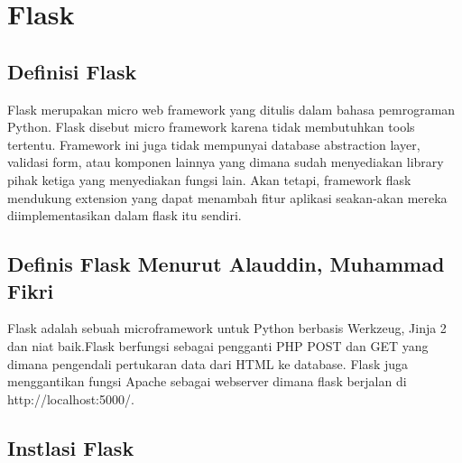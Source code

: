 \documentclass[12pt,a4paper]{article}
\begin{document}
\section{Flask}
\subsection{Definisi Flask}
Flask merupakan micro web framework yang ditulis dalam bahasa pemrograman Python. Flask disebut micro framework karena tidak membutuhkan tools tertentu. Framework ini juga tidak mempunyai database abstraction layer, validasi form, atau komponen lainnya yang dimana sudah menyediakan library pihak ketiga yang menyediakan fungsi lain. Akan tetapi, framework flask mendukung extension yang dapat menambah fitur aplikasi seakan-akan mereka diimplementasikan dalam flask itu sendiri.
\subsection{Definis Flask Menurut Alauddin, Muhammad Fikri}
Flask adalah sebuah microframework untuk Python berbasis Werkzeug, Jinja 2 dan niat baik.Flask berfungsi sebagai pengganti PHP POST dan GET yang dimana pengendali pertukaran data dari HTML ke database. Flask juga menggantikan fungsi Apache sebagai webserver dimana flask berjalan di http://localhost:5000/.
\subsection{Instlasi Flask}
\end{document}
